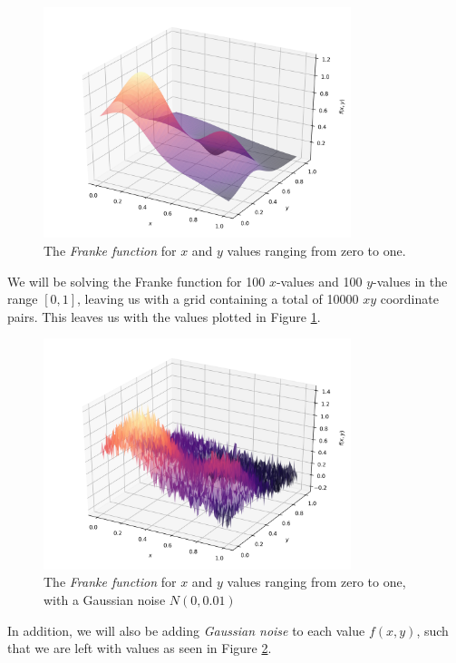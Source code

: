 \documentclass[a4paper,10pt,english]{article}
\begin{document}
\begin{figure}[H]
	\centering
	\includegraphics[width = 0.8\textwidth, center]{Franke.png}
	\caption{The \textit{Franke function} for $x$ and $y$ values ranging from zero to one. \label{fig_Franke}}
\end{figure}

We will be solving the Franke function for 100 $x$-values and 100 $y$-values in the range $[0,1]$, leaving us with a grid containing a total of 10000 $xy$ coordinate pairs.  This leaves us with the values plotted in Figure \ref{fig_Franke}.

\begin{figure}[H]
	\centering
	\includegraphics[width = 0.8\textwidth, center]{Franke_noise.png}
	\caption{The \textit{Franke function} for $x$ and $y$ values ranging from zero to one, with a Gaussian noise $N(0,0.01)$\label{fig_Franke_noise}}
\end{figure}

In addition, we will also be adding \textit{Gaussian noise} to each value $f(x,y)$, such that we are left with values as seen in Figure \ref{fig_Franke_noise}.
\end{document}
